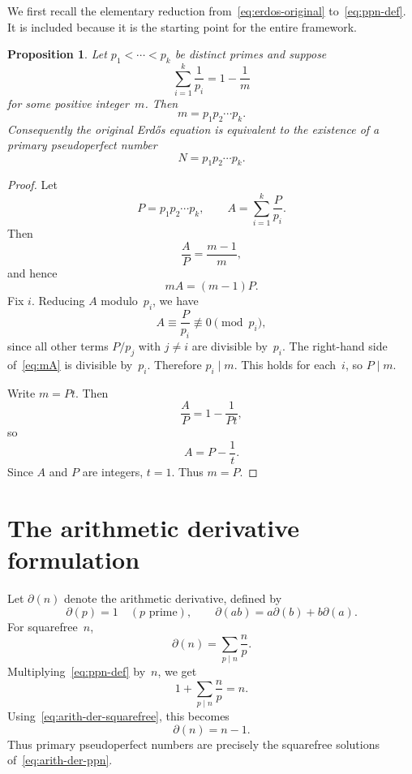 \documentclass[11pt]{amsart}
\theoremstyle{plain}
\newtheorem{proposition}[theorem]{Proposition}
\theoremstyle{definition}
\theoremstyle{remark}
\newcommand{\dd}{\partial}
\begin{document}
We first recall the elementary reduction from~\eqref{eq:erdos-original} to~\eqref{eq:ppn-def}.  It is included because it is the starting point for the entire framework.

\begin{proposition}\label{prop:erdos-equivalence}
Let $p_1<\cdots<p_k$ be distinct primes and suppose
\[
        \sum_{i=1}^k\frac1{p_i}=1-\frac1m
\]
for some positive integer~$m$.  Then
\[
        m=p_1p_2\cdots p_k.
\]
Consequently the original Erd\H{o}s equation is equivalent to the existence of a primary pseudoperfect number
\[
        N=p_1p_2\cdots p_k.
\]
\end{proposition}

\begin{proof}
Let
\[
        P=p_1p_2\cdots p_k,
        \qquad
        A=\sum_{i=1}^k\frac{P}{p_i}.
\]
Then
\[
        \frac AP=\frac{m-1}{m},
\]
and hence
\begin{equation}\label{eq:mA}
        mA=(m-1)P.
\end{equation}
Fix $i$.  Reducing $A$ modulo~$p_i$, we have
\[
        A\equiv \frac{P}{p_i}\not\equiv0\pmod {p_i},
\]
since all other terms $P/p_j$ with $j\ne i$ are divisible by~$p_i$.  The right-hand side of~\eqref{eq:mA} is divisible by~$p_i$.  Therefore $p_i\mid m$.  This holds for each~$i$, so $P\mid m$.

Write $m=Pt$.  Then
\[
        \frac AP=1-\frac1{Pt},
\]
so
\[
        A=P-\frac1t.
\]
Since $A$ and $P$ are integers, $t=1$.  Thus $m=P$.
\end{proof}

\section{The arithmetic derivative formulation}

Let $\dd(n)$ denote the arithmetic derivative, defined by
\[
        \dd(p)=1\quad(p\text{ prime}),
        \qquad
        \dd(ab)=a\dd(b)+b\dd(a).
\]
For squarefree~$n$,
\begin{equation}\label{eq:arith-der-squarefree}
        \dd(n)=\sum_{p\mid n}\frac np.
\end{equation}
Multiplying~\eqref{eq:ppn-def} by~$n$, we get
\[
        1+\sum_{p\mid n}\frac np=n.
\]
Using~\eqref{eq:arith-der-squarefree}, this becomes
\begin{equation}\label{eq:arith-der-ppn}
        \boxed{\dd(n)=n-1.}
\end{equation}
Thus primary pseudoperfect numbers are precisely the squarefree solutions of~\eqref{eq:arith-der-ppn}.
\end{document}
